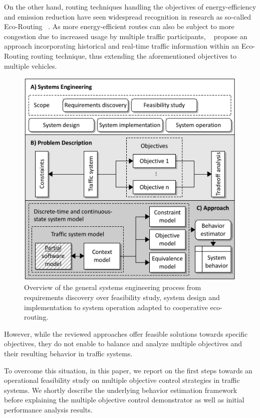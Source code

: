 \documentclass[conference]{../cls/IEEEtran}
\begin{document}
On the other hand, routing techniques handling the objectives of energy-efficiency
and emission reduction have seen widespread recognition in
research as so-called Eco-Routing ~\cite{Ericsson2006, Barth2007}. As more
energy-efficient routes can also be subject to more congestion due to increased
usage by multiple traffic participants, ~\cite{Boriboonsomsin2012} propose an approach incorporating historical and real-time traffic information within an Eco-Routing routing technique, thus
extending the aforementioned objectives to multiple vehicles.
\begin{figure}[b!]
	\includegraphics[width=\columnwidth]{../gfx/overview-variant.pdf}
	\caption{Overview of the general systems engineering process from requirements discovery over feasibility study, system design and implementation to system operation adapted to cooperative eco-routing.}
	\label{figure:process}
\end{figure}
However, while the reviewed approaches offer feasible solutions
towards specific objectives, they do not enable to
balance and analyze multiple objectives and their resulting behavior in traffic
systems.

To overcome this situation, in this paper, we report on the first steps towards
an operational feasibility study on multiple objective control strategies in traffic systems. We shortly describe the
underlying behavior estimation framework before explaining the multiple objective control demonstrator as well as initial performance analysis results.
\end{document}
